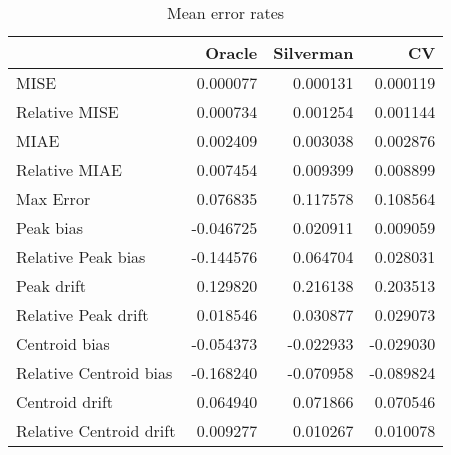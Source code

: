 \begin{table}[ht]
\centering
\begin{tabular}{lrrr}
  \hline
 & Oracle & Silverman & CV \\ 
  \hline
MISE & 0.000077 & 0.000131 & 0.000119 \\ 
  Relative MISE & 0.000734 & 0.001254 & 0.001144 \\ 
  MIAE & 0.002409 & 0.003038 & 0.002876 \\ 
  Relative MIAE & 0.007454 & 0.009399 & 0.008899 \\ 
  Max Error & 0.076835 & 0.117578 & 0.108564 \\ 
  Peak bias & -0.046725 & 0.020911 & 0.009059 \\ 
  Relative Peak bias & -0.144576 & 0.064704 & 0.028031 \\ 
  Peak drift & 0.129820 & 0.216138 & 0.203513 \\ 
  Relative Peak drift & 0.018546 & 0.030877 & 0.029073 \\ 
  Centroid bias & -0.054373 & -0.022933 & -0.029030 \\ 
  Relative Centroid bias & -0.168240 & -0.070958 & -0.089824 \\ 
  Centroid drift & 0.064940 & 0.071866 & 0.070546 \\ 
  Relative Centroid drift & 0.009277 & 0.010267 & 0.010078 \\ 
   \hline
\end{tabular}
\caption{Mean error rates} 
\label{tbl:mean_error_rates}
\end{table}
